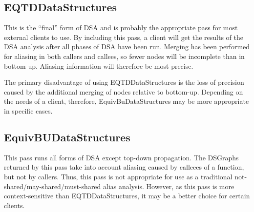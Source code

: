 \documentclass{article}
\begin{document}
\subsection{EQTDDataStructures}

This is the ``final'' form of DSA and is probably the appropriate pass
for most external clients to use.  By including this pass, a client
will get the results of the DSA analysis after all phases of DSA have
been run.  Merging has been performed for aliasing in both callers and
callees, so fewer nodes will be incomplete than in bottom-up.
Aliasing information will therefore be most precise.

The primary disadvantage of using EQTDDataStructures is the loss of
precision caused by the additional merging of nodes relative to
bottom-up.  Depending on the needs of a client, therefore,
EquivBuDataStructures may be more appropriate in specific cases.

\subsection{EquivBUDataStructures}

This pass runs all forms of DSA except top-down propagation.  The
DSGraphs returned by this pass take into account aliasing caused by
calleees of a function, but not by callers.  Thus, this pass is not
appropriate for use as a traditional not-shared/may-shared/must-shared
alias analysis.  However, as this pass is more context-sensitive than
EQTDDataStructures, it may be a better choice for certain clients.
\end{document}
